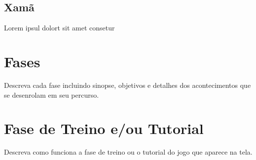 \subsection{Xamã}

Lorem ipsul dolort sit amet consetur

\section{Fases}

Descreva cada fase incluindo sinopse, objetivos e detalhes dos acontecimentos que se desenrolam em seu percurso.


\section{Fase de Treino e/ou Tutorial}

Descreva como funciona a fase de treino ou o tutorial do jogo que aparece na tela.
